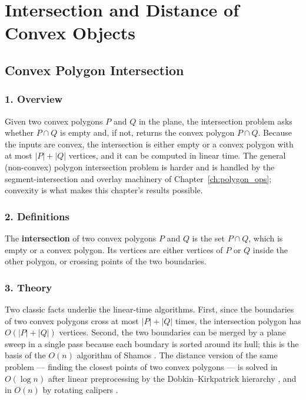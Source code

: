 \chapter{Intersection and Distance of Convex Objects}
\label{ch:convex_intersection}

\section{Convex Polygon Intersection}
\label{sec:convexint_polygon_intersection}

\subsection{1. Overview}

Given two convex polygons $P$ and $Q$ in the plane, the intersection problem
asks whether $P \cap Q$ is empty and, if not, returns the convex polygon
$P \cap Q$. Because the inputs are convex, the intersection is either empty
or a convex polygon with at most $|P| + |Q|$ vertices, and it can be
computed in linear time. The general (non-convex) polygon intersection
problem is harder and is handled by the segment-intersection and overlay
machinery of Chapter~\ref{ch:polygon_ops}; convexity is what makes this
chapter's results possible.

\subsection{2. Definitions}

\begin{definition}\label{def:convexint_polygon_inter}
  The \textbf{intersection} of two convex polygons $P$ and $Q$ is the set
  $P \cap Q$, which is empty or a convex polygon. Its vertices are either
  vertices of $P$ or $Q$ inside the other polygon, or crossing points of
  the two boundaries.
\end{definition}

\subsection{3. Theory}

Two classic facts underlie the linear-time algorithms. First, since the
boundaries of two convex polygons cross at most $|P|+|Q|$ times, the
intersection polygon has $O(|P|+|Q|)$ vertices. Second, the two boundaries
can be merged by a plane sweep in a single pass because each boundary is
sorted around its hull; this is the basis of the $O(n)$ algorithm of Shamos
\cite{preparata1985}. The distance version of the same problem --- finding
the closest points of two convex polygons --- is solved in $O(\log n)$
after linear preprocessing by the Dobkin--Kirkpatrick hierarchy
\cite{dobkin1983,dobkin1985}, and in $O(n)$ by rotating calipers
\cite{toussaint1983}.

